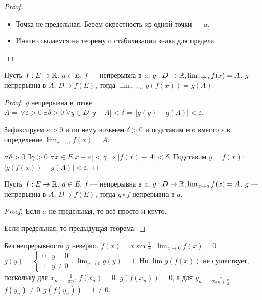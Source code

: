 \begin{proof}
    \slashn
    \begin{itemize}
        \item Точка не предельная. Берем окрестность из одной точки --- $a$.
        \item Иначе ссылаемся на теорему о стабилизации знака для предела
    \end{itemize}
\end{proof}
\begin{theorem}
	Пусть $f: E \to \mathbb{R}$,  $a \in E$,  $f$ --- непрерывна в  $a$,  $g: D \to \mathbb{R}, \lim_{x \to a} f(x) = A$,  $g$ --- непрерывна в  $A$,  $D \supset f(E)$, тогда  $\lim_{x \to a} g(f(x)) = g(A)$.
\end{theorem}
\begin{proof}
    $g$ непрерывна в точке  $A \Rightarrow \forall \varepsilon > 0 \; \exists \delta > 0 \; \forall y \in D\, |y-A| < \delta \Rightarrow |g(y) - g(A)| < \varepsilon$. 

    Зафиксируем  $\varepsilon > 0$ и по нему возьмем  $\delta > 0$ и подставим его вместо  $\varepsilon$ в определение  $\lim_{x \to a} f(x) = A$. 

    $\forall \delta > 0 \; \exists \gamma > 0 \; \forall x \in E |x - a| < \gamma \Rightarrow |f(x)  - A| < \delta$. Подставим $y = f(x)$:  $|g(f(x)) - g(A)| < \varepsilon$.
\end{proof}
\begin{consequence}
    Пусть $f: E \to \mathbb{R}$,  $a \in E$,  $f$ --- непрерывна в  $a$,  $g: D \to \mathbb{R}, \lim_{x \to a} f(x) = A$,  $g$ --- непрерывна в  $A$,  $D \supset f(E)$, тогда $g \circ f$ непрерывна в $a$.
\end{consequence}
\begin{proof}
    Если $a$ не предельная, то всё просто и круто.

    Если предельная, то предыдущая теорема.
\end{proof}
\begin{remark}
    Без непрерывности $g$ неверно.  $f(x) = x \sin \frac{1}{x}$. $\lim_{x \to 0} f(x) = 0$
    $g(y) = \begin{cases} 0 & y = 0 \\ 1 & y \neq 0\end{cases}$.  $\lim_{y \to 0} g(y) = 1$.  Но  $\lim g(f(x))$ не существует, поскольку для $x_n = \frac{1}{\pi n}$, $f(x_n) = 0$.  $g(f(x_n)) = 0$, а для $y_n = \frac{1}{2\pi n + \frac{\pi}{2}}$ $f(y_n) \neq 0, g(f(y_n)) = 1 \neq 0$.
\end{remark}
